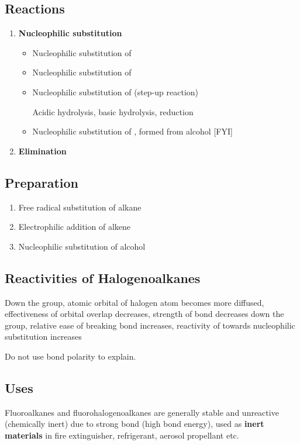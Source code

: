 \documentclass[12pt,a4 paper]{article}
\begin{document}
\subsection{Reactions}
\begin{enumerate}
\item \textbf{Nucleophilic substitution}
	\begin{itemize}
	\item Nucleophilic substitution of 
	\item Nucleophilic substitution of 
	\item Nucleophilic substitution of  (step-up reaction)
	
	Acidic hydrolysis, basic hydrolysis, reduction
	\item Nucleophilic substitution of , formed from alcohol [FYI]
	\end{itemize}
\item \textbf{Elimination}
\end{enumerate}

\subsection{Preparation}
\begin{enumerate}
\item Free radical substitution of alkane
\item Electrophilic addition of alkene
\item Nucleophilic substitution of alcohol
\end{enumerate}

\subsection{Reactivities of Halogenoalkanes}
Down the group, atomic orbital of halogen atom becomes more diffused, effectiveness of orbital overlap decreases, strength of  bond decreases down the group, relative ease of breaking  bond increases, reactivity of  towards nucleophilic substitution increases

\begin{remark}
Do not use bond polarity to explain.
\end{remark}

\subsection{Uses}
Fluoroalkanes and fluorohalogenoalkanes are generally stable and unreactive (chemically inert) due to strong  bond (high bond energy), used as \textbf{inert materials} in fire extinguisher, refrigerant, aerosol propellant etc.
\end{document}
